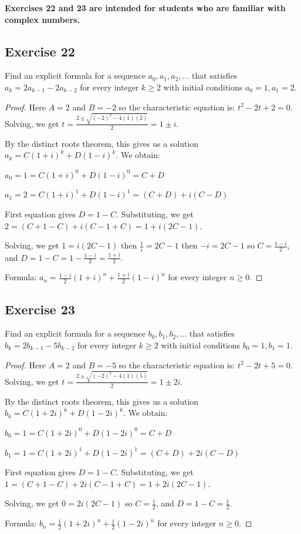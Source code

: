 \documentclass[14pt]{extarticle}
\newcommand{\dps}{\displaystyle}
\newcommand{\cy}{\color{cyan}}
\begin{document}
{\bf \cy Exercises 22 and 23 are intended for students who are familiar with complex numbers.}

\subsection{Exercise 22}
Find an explicit formula for a sequence \(a_0, a_1, a_2, \ldots\) that satisfies \(a_k = 2a_{k-1} - 2a_{k-2}\) 
for every integer \(k \geq 2\) with initial conditions \(a_0 = 1, a_1 = 2\).

\begin{proof}
Here $A = 2$ and $B = -2$ so the characteristic equation is: \(t^2 - 2t + 2 = 0\). 
Solving, we get \(\dps t = \frac{2 \pm \sqrt{(-2)^2 - 4(1)(2)}}{2} = 1 \pm i\).

By the distinct roots theorem, this gives us a solution \(a_k = C(1+i)^k + D(1-i)^k\). We obtain:

\(a_0 = 1 = C(1+i)^0 + D(1-i)^0 = C + D\)

\(a_1 = 2 = C(1+i)^1 + D(1-i)^1 = (C + D) + i(C - D)\)

First equation gives $D = 1 - C$. Substituting, we get \(2 = (C+1-C) + i(C - 1 + C) = 1 + i(2C-1)\).

Solving, we get \(1 = i(2C-1)\) then \(\frac{1}{i} = 2C-1\) then \(-i = 2C-1\) so \(C = \frac{1-i}{2}\),
and \(\dps D = 1 - C = 1 - \frac{1-i}{2} = \frac{1+i}{2}\).

Formula: \(\dps a_n = \frac{1-i}{2}(1+i)^n + \frac{1+i}{2}(1-i)^n\) for every integer \(n \geq 0\).
\end{proof}

\subsection{Exercise 23}
Find an explicit formula for a sequence \(b_0, b_1, b_2, \ldots\) that satisfies \(b_k = 2b_{k-1} - 5b_{k-2}\) 
for every integer \(k \geq 2\) with initial conditions \(b_0 = 1, b_1 = 1\).

\begin{proof}
Here $A = 2$ and $B = -5$ so the characteristic equation is: \(t^2 - 2t + 5 = 0\). 
Solving, we get \(\dps t = \frac{2 \pm \sqrt{(-2)^2 - 4(1)(5)}}{2} = 1 \pm 2i\).

By the distinct roots theorem, this gives us a solution \(b_k = C(1+2i)^k + D(1-2i)^k\). We obtain:

\(b_0 = 1 = C(1+2i)^0 + D(1-2i)^0 = C + D\)

\(b_1 = 1 = C(1+2i)^1 + D(1-2i)^1 = (C + D) + 2i(C - D)\)

First equation gives $D = 1 - C$. Substituting, we get \(1 = (C+1-C) + 2i(C - 1 + C) = 1 + 2i(2C-1)\).

Solving, we get \(0 = 2i(2C-1)\) so \(C = \frac{1}{2}\),
and \(\dps D = 1 - C = \frac{1}{2}\).

Formula: \(\dps b_n = \frac{1}{2}(1+2i)^n + \frac{1}{2}(1-2i)^n\) for every integer \(n \geq 0\).
\end{proof}
\end{document}
